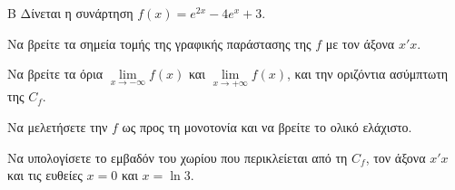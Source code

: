 \begin{thema}{Β}
Δίνεται η συνάρτηση $f(x) = e^{2x} - 4e^x + 3$.
\begin{erwthma}
\item Να βρείτε τα σημεία τομής της γραφικής παράστασης της $f$ με τον άξονα $x'x$.
\item Να βρείτε τα όρια $\lim\limits_{x \to -\infty} f(x)$ και $\lim\limits_{x \to +\infty} f(x)$, και την οριζόντια ασύμπτωτη της $C_f$.
\item Να μελετήσετε την $f$ ως προς τη μονοτονία και να βρείτε το ολικό ελάχιστο.
\item Να υπολογίσετε το εμβαδόν του χωρίου που περικλείεται από τη $C_f$, τον άξονα $x'x$ και τις ευθείες $x=0$ και $x=\ln 3$.
\end{erwthma}
\end{thema}
